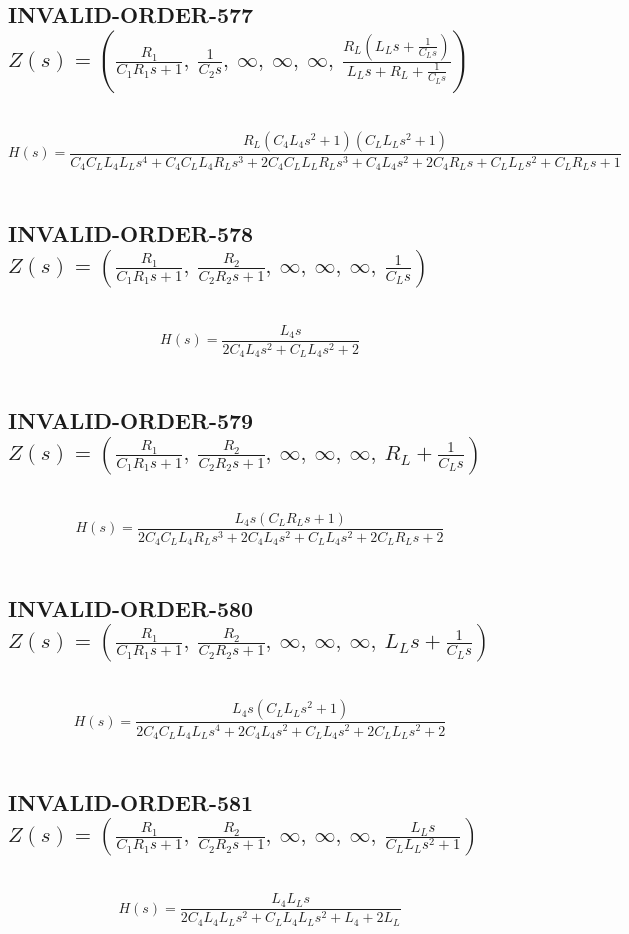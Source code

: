 \documentclass{article}
\begin{document}
\subsection{INVALID-ORDER-577 $Z(s) = \left( \frac{R_{1}}{C_{1} R_{1} s + 1}, \  \frac{1}{C_{2} s}, \  \infty, \  \infty, \  \infty, \  \frac{R_{L} \left(L_{L} s + \frac{1}{C_{L} s}\right)}{L_{L} s + R_{L} + \frac{1}{C_{L} s}}\right)$ } \ 
\textbf{\[H(s) = \frac{R_{L} \left(C_{4} L_{4} s^{2} + 1\right) \left(C_{L} L_{L} s^{2} + 1\right)}{C_{4} C_{L} L_{4} L_{L} s^{4} + C_{4} C_{L} L_{4} R_{L} s^{3} + 2 C_{4} C_{L} L_{L} R_{L} s^{3} + C_{4} L_{4} s^{2} + 2 C_{4} R_{L} s + C_{L} L_{L} s^{2} + C_{L} R_{L} s + 1}\] } \ 
\subsection{INVALID-ORDER-578 $Z(s) = \left( \frac{R_{1}}{C_{1} R_{1} s + 1}, \  \frac{R_{2}}{C_{2} R_{2} s + 1}, \  \infty, \  \infty, \  \infty, \  \frac{1}{C_{L} s}\right)$ } \ 
\textbf{\[H(s) = \frac{L_{4} s}{2 C_{4} L_{4} s^{2} + C_{L} L_{4} s^{2} + 2}\] } \ 
\subsection{INVALID-ORDER-579 $Z(s) = \left( \frac{R_{1}}{C_{1} R_{1} s + 1}, \  \frac{R_{2}}{C_{2} R_{2} s + 1}, \  \infty, \  \infty, \  \infty, \  R_{L} + \frac{1}{C_{L} s}\right)$ } \ 
\textbf{\[H(s) = \frac{L_{4} s \left(C_{L} R_{L} s + 1\right)}{2 C_{4} C_{L} L_{4} R_{L} s^{3} + 2 C_{4} L_{4} s^{2} + C_{L} L_{4} s^{2} + 2 C_{L} R_{L} s + 2}\] } \ 
\subsection{INVALID-ORDER-580 $Z(s) = \left( \frac{R_{1}}{C_{1} R_{1} s + 1}, \  \frac{R_{2}}{C_{2} R_{2} s + 1}, \  \infty, \  \infty, \  \infty, \  L_{L} s + \frac{1}{C_{L} s}\right)$ } \ 
\textbf{\[H(s) = \frac{L_{4} s \left(C_{L} L_{L} s^{2} + 1\right)}{2 C_{4} C_{L} L_{4} L_{L} s^{4} + 2 C_{4} L_{4} s^{2} + C_{L} L_{4} s^{2} + 2 C_{L} L_{L} s^{2} + 2}\] } \ 
\subsection{INVALID-ORDER-581 $Z(s) = \left( \frac{R_{1}}{C_{1} R_{1} s + 1}, \  \frac{R_{2}}{C_{2} R_{2} s + 1}, \  \infty, \  \infty, \  \infty, \  \frac{L_{L} s}{C_{L} L_{L} s^{2} + 1}\right)$ } \ 
\textbf{\[H(s) = \frac{L_{4} L_{L} s}{2 C_{4} L_{4} L_{L} s^{2} + C_{L} L_{4} L_{L} s^{2} + L_{4} + 2 L_{L}}\] } \ 
\end{document}
